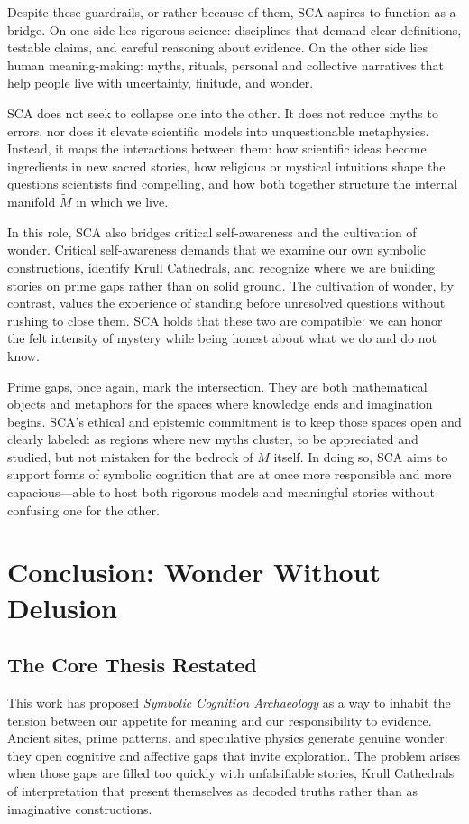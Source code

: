 \documentclass[12]{amsart}
\theoremstyle{plain}
\begin{document}
Despite these guardrails, or rather because of them, SCA aspires to function as a bridge. On one side lies rigorous science: disciplines that demand clear definitions, testable claims, and careful reasoning about evidence. On the other side lies human meaning-making: myths, rituals, personal and collective narratives that help people live with uncertainty, finitude, and wonder.

SCA does not seek to collapse one into the other. It does not reduce myths to errors, nor does it elevate scientific models into unquestionable metaphysics. Instead, it maps the interactions between them: how scientific ideas become ingredients in new sacred stories, how religious or mystical intuitions shape the questions scientists find compelling, and how both together structure the internal manifold $\tilde M$ in which we live.

In this role, SCA also bridges critical self-awareness and the cultivation of wonder. Critical self-awareness demands that we examine our own symbolic constructions, identify Krull Cathedrals, and recognize where we are building stories on prime gaps rather than on solid ground. The cultivation of wonder, by contrast, values the experience of standing before unresolved questions without rushing to close them. SCA holds that these two are compatible: we can honor the felt intensity of mystery while being honest about what we do and do not know.

Prime gaps, once again, mark the intersection. They are both mathematical objects and metaphors for the spaces where knowledge ends and imagination begins. SCA's ethical and epistemic commitment is to keep those spaces open and clearly labeled: as regions where new myths cluster, to be appreciated and studied, but not mistaken for the bedrock of $M$ itself. In doing so, SCA aims to support forms of symbolic cognition that are at once more responsible and more capacious—able to host both rigorous models and meaningful stories without confusing one for the other.

\section{Conclusion: Wonder Without Delusion}

\subsection{The Core Thesis Restated}

This work has proposed \emph{Symbolic Cognition Archaeology} as a way to inhabit the tension between our appetite for meaning and our responsibility to evidence. Ancient sites, prime patterns, and speculative physics generate genuine wonder: they open cognitive and affective gaps that invite exploration. The problem arises when those gaps are filled too quickly with unfalsifiable stories, Krull Cathedrals of interpretation that present themselves as decoded truths rather than as imaginative constructions.
\end{document}
